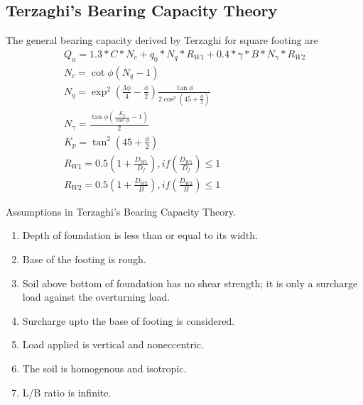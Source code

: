 \subsection{Terzaghi’s Bearing Capacity Theory}
The general bearing capacity derived by Terzaghi for square footing are
\begin{gather}
Q_u = 1.3 * C * N_c + q_0 * N_q * R_{W1} + 0.4 * {\gamma} * B * N_{\gamma} * R_{W2} \\
N_c = \cot \phi (N_q - 1)\\
N_q = \exp ^ 2 (\frac{3\phi}{4} - \frac{\phi}{2}) \frac{\tan \phi}{2 \cos ^2 (45 + \frac{\phi}{2})}\\
N_{\gamma} = \frac{\tan \phi (\frac{K_p}{\cos ^2 \phi} - 1)}{2}\\
K_p= \tan ^ 2 (45 + \frac{\phi}{2})\\
R_{W1} = 0.5 (1 +\frac{D_{W1}}{D_f}), if (\frac{D_{W1}}{D_f})\le 1 \\
R_{W2} = 0.5 (1 +\frac{D_{W2}}{B}), if (\frac{D_{W2}}{B})\le 1
\end{gather}

Assumptions in Terzaghi’s Bearing Capacity Theory.
\begin{enumerate}
\item Depth of foundation is less than or equal to its width.
\item Base of the footing is rough.
\item Soil above bottom of foundation has no shear strength; it is only a surcharge load against the overturning load.
\item Surcharge upto the base of footing is considered.
\item Load applied is vertical and non\-eccentric.
\item The soil is homogenous and isotropic.
\item L/B ratio is infinite.
\end{enumerate}

